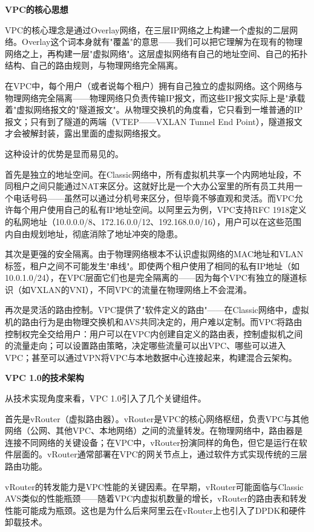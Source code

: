 \textbf{VPC的核心思想}

VPC的核心理念是通过Overlay网络，在三层IP网络之上构建一个虚拟的二层网络。Overlay这个词本身就有"覆盖"的意思——我们可以把它理解为在现有的物理网络之上，再构建一层"虚拟网络"。这层虚拟网络有自己的地址空间、自己的拓扑结构、自己的路由规则，与物理网络完全隔离。

在VPC中，每个用户（或者说每个租户）拥有自己独立的虚拟网络。这个网络与物理网络完全隔离——物理网络只负责传输IP报文，而这些IP报文实际上是"承载着"虚拟网络报文的"隧道报文"。从物理交换机的角度看，它只看到一堆普通的IP报文；只有到了隧道的两端（VTEP——VXLAN Tunnel End Point），隧道报文才会被解封装，露出里面的虚拟网络报文。

这种设计的优势是显而易见的。

首先是独立的地址空间。在Classic网络中，所有虚拟机共享一个内网地址段，不同租户之间只能通过NAT来区分。这就好比是一个大办公室里的所有员工共用一个电话号码——虽然可以通过分机号来区分，但毕竟不够直观和灵活。而VPC允许每个用户使用自己的私有IP地址空间。以阿里云为例，VPC支持RFC 1918定义的私网地址（10.0.0.0/8、172.16.0.0/12、192.168.0.0/16），用户可以在这些范围内自由规划地址，彻底消除了地址冲突的隐患。

其次是更强的安全隔离。由于物理网络根本不认识虚拟网络的MAC地址和VLAN标签，租户之间不可能发生"串线"。即使两个租户使用了相同的私有IP地址（如10.0.1.0/24），在VPC层面它们也是完全隔离的——因为每个VPC有独立的隧道标识（如VXLAN的VNI），不同VPC的流量在物理网络上不会混淆。

再次是灵活的路由控制。VPC提供了"软件定义的路由"——在Classic网络中，虚拟机的路由行为是由物理交换机和AVS共同决定的，用户难以定制。而VPC将路由控制权完全交给用户：用户可以在VPC内创建自定义的路由表，控制虚拟机之间的流量走向；可以设置路由策略，决定哪些流量可以出VPC、哪些可以进入VPC；甚至可以通过VPN将VPC与本地数据中心连接起来，构建混合云架构。

\textbf{VPC 1.0的技术架构}

从技术实现角度来看，VPC 1.0引入了几个关键组件。

首先是vRouter（虚拟路由器）。vRouter是VPC的核心网络枢纽，负责VPC与其他网络（公网、其他VPC、本地网络）之间的流量转发。在物理网络中，路由器是连接不同网络的关键设备；在VPC中，vRouter扮演同样的角色，但它是运行在软件层面的。vRouter通常部署在VPC的网关节点上，通过软件方式实现传统的三层路由功能。

vRouter的转发能力是VPC性能的关键因素。在早期，vRouter可能面临与Classic AVS类似的性能瓶颈——随着VPC内虚拟机数量的增长，vRouter的路由表和转发性能可能成为瓶颈。这也是为什么后来阿里云在vRouter上也引入了DPDK和硬件卸载技术。


